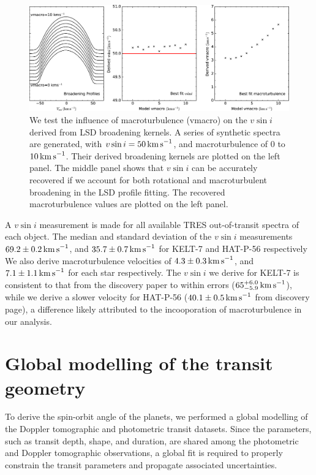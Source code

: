 \documentclass[useAMS,usenatbib]{mn2e}
\begin{document}
\begin{figure}
  \includegraphics[width=12cm]{plots/vmacro.eps}
  \caption{\label{fig:vmacro} We test the influence of macroturbulence (vmacro) on the $v\sin i$ derived from LSD broadening kernels. A series of synthetic spectra are generated, with $v\sin i=50\,\text{km\,s}^{-1}$, and macroturbulence of 0 to $10\,\text{km\,s}^{-1}$. Their derived broadening kernels are plotted on the left panel. The middle panel shows that $v\sin i$ can be accurately recovered if we account for both rotational and macroturbulent broadening in the LSD profile fitting. The recovered macroturbulence values are plotted on the left panel.}
\end{figure}

A $v\sin i$ measurement is made for all available TRES out-of-transit spectra of each object. The median and standard deviation of the $v\sin i$ measurements $69.2\pm0.2\,\text{km\,s}^{-1}$, and $35.7\pm0.7\,\text{km\,s}^{-1}$ for KELT-7 and HAT-P-56 respectively  We also derive macroturbulence velocities of $4.3\pm0.3\,\text{km\,s}^{-1}$, and $7.1\pm1.1\,\text{km\,s}^{-1}$ for each star respectively. The $v\sin i$ we derive for KELT-7 is consistent to that from the discovery paper to within errors ($65_{-5.9}^{+6.0}\,\text{km\,s}^{-1}$), while we derive a slower velocity for HAT-P-56 ($40.1\pm0.5\,\text{km\,s}^{-1}$ from discovery page), a difference likely attributed to the incooporation of macroturbulence in our analysis.   

\section{Global modelling of the transit geometry}
\label{sec:modelling}

To derive the spin-orbit angle of the planets, we performed a global modelling of the Doppler tomographic and photometric transit datasets. Since the parameters, such as transit depth, shape, and duration, are shared among the photometric and Doppler tomographic observations, a global fit is required to properly constrain the transit parameters and propagate associated uncertainties.
\end{document}
